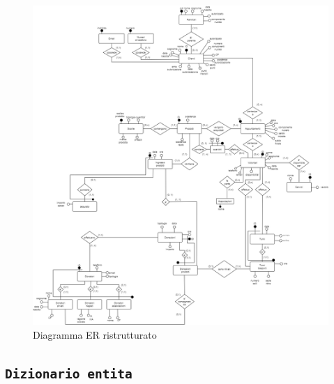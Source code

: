 \documentclass[]{article}
\begin{document}
\begin{figure}
\centering
\includegraphics{media/social_market_v2_ristrutturato.drawio.png}
\caption{Diagramma ER ristrutturato}
\end{figure}

\newpage

\hypertarget{dizionario-entita}{%
\subsection{\texorpdfstring{\texttt{Dizionario\ entita\textquotesingle{}}}{Dizionario entita'}}\label{dizionario-entita}}
\end{document}
